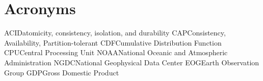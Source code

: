 \chapter*{Acronyms}

\begin{acronym}[RDBMS]
\ac{ACID}{atomicity, consistency, isolation, and durability}
\ac{CAP}{Consistency, Availability, Partition-tolerant}
\ac{CDF}{Cumulative Distribution Function}
\ac{CPU}{Central Processing Unit}
\ac{NOAA}{National Oceanic and Atmospheric Administration}
\ac{NGDC}{National Geophysical Data Center}
\ac{EOG}{Earth Observation Group}
\ac{GDP}{Gross Domestic Product}
\end{acronym}


